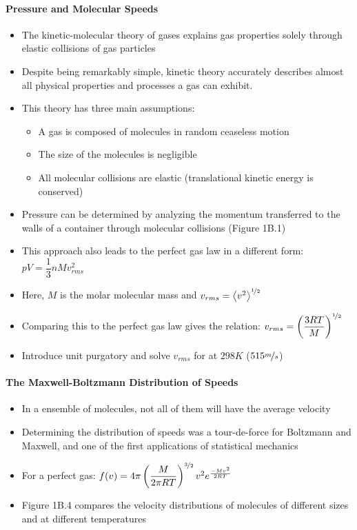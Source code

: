 \documentclass[12pt, openany, letterpaper]{memoir}
\begin{document}
\paragraph{Pressure and Molecular Speeds}
\begin{itemize}
	\item The kinetic-molecular theory of gases explains gas properties solely through elastic collisions of gas particles
	\item Despite being remarkably simple, kinetic theory accurately describes almost all physical properties and processes a gas can exhibit.
	\item This theory has three main assumptions:
	      \begin{itemize}
		      \item A gas is composed of molecules in random ceaseless motion
		      \item The size of the molecules is negligible
		      \item All molecular collisions are elastic (translational kinetic energy is conserved)
	      \end{itemize}
	\item Pressure can be determined by analyzing the momentum transferred to the walls of a container through molecular collisions (Figure 1B.1)
	\item This approach also leads to the perfect gas law in a different form: $pV=\dfrac{1}{3}nMv_{rms}^2$
	\item Here, $M$ is the molar molecular mass and $v_{rms}=\left< v^2 \right>^{\nicefrac{1}{2}}$
	\item Comparing this to the perfect gas law gives the relation: $v_{rms}=\left(\dfrac{3RT}{M}\right)^{\nicefrac{1}{2}}$
  \item Introduce unit purgatory and solve $v_{rms}$ for  at $298K$ ($515\nicefrac{m}{s}$)
\end{itemize}
\paragraph{The Maxwell-Boltzmann Distribution of Speeds}
\begin{itemize}
	\item In a ensemble of molecules, not all of them will have the average velocity
	\item Determining the distribution of speeds was a tour-de-force for Boltzmann and Maxwell, and one of the first applications of statistical mechanics
	\item For a perfect gas: $f(v) = 4\pi\left(\dfrac{M}{2\pi RT}\right)^{\nicefrac{3}{2}}v^2e^{\frac{-Mv^2}{2RT}}$
	\item Figure 1B.4 compares the velocity distributions of molecules of different sizes and at different temperatures
\end{itemize}
\end{document}

